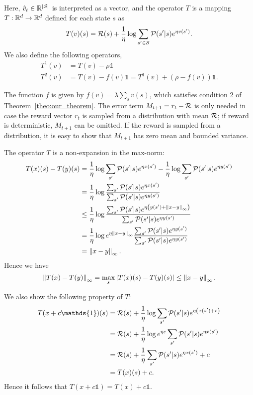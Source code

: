 Here, $\hat v_t\in\mathbb{R}^{\lvert\mathcal{S}\rvert}$ is interpreted as a vector, and the operator $T$ is a mapping $T:\mathbb{R}^d\rightarrow\mathbb{R}^d$ defined for each state $s$ as
\begin{equation*}
    T(v)(s) = \mathcal{R}(s) + \frac 1 \eta \log \sum_{s'\in\mathcal{S}} \mathcal{P}(s'|s) e^{ \eta v(s') }.
\end{equation*}
We also define the following operators, 
\begin{align*}
    T^1(v) &= T(v) - \rho\mathds{1} \\
    T^2(v) &= T(v) - f(v)\mathds{1} =  T^1(v) + (\rho - f(v))\mathds{1}.
\end{align*}

The function $f$ is given by $f(v) = \lambda\sum_s v(s)$, which satisfies condition 2 of Theorem~\ref{theo:our_theorem}. The error term $M_{t+1}=r_t-\mathcal{R}$ is only needed in case the reward vector $r_t$ is sampled from a distribution with mean $\mathcal{R}$; if reward is deterministic, $M_{t+1}$ can be omitted. If the reward is sampled from a distribution, it is easy to show that $M_{t+1}$ has zero mean and bounded variance.

The operator $T$ is a non-expansion in the max-norm:
\begin{align*}
T(x)(s) - T(y)(s) &= \frac 1 \eta \log \sum_{s'} \mathcal{P}(s'|s) e^{\eta x(s')} - \frac 1 \eta \log \sum_{s'} \mathcal{P}(s'|s) e^{\eta y(s')}\\
 &= \frac 1 \eta \log \frac {\sum_{s'} \mathcal{P}(s'|s) e^{\eta x(s')}} {\sum_{s'} \mathcal{P}(s'|s) e^{\eta y(s')}}\\
 &\leq \frac 1 \eta \log \frac {\sum_{s'} \mathcal{P}(s'|s) e^{\eta \left( y(s') + \left\|x-y\right\|_\infty \right)}} {\sum_{s'} \mathcal{P}(s'|s) e^{\eta y(s')}}\\
 &= \frac 1 \eta \log e^{\eta \left\|x-y\right\|_\infty } \frac {\sum_{s'} \mathcal{P}(s'|s) e^{\eta y(s')}} {\sum_{s'} \mathcal{P}(s'|s) e^{\eta y(s')}}\\
 &= \left\|x - y\right\|_\infty.
\end{align*}
Hence we have
\[
\left\|T(x)-T(y)\right\|_\infty = \max_s |T(x)(s) - T(y)(s)| \leq \left\|x - y\right\|_\infty.
\]

We also show the following property of $T$:
\begin{align*}
T(x + c\mathds{1})(s) &= \cR(s) + \frac 1 \eta \log \sum_{s'} \cP(s'|s) e^{\eta \pa{ x(s') + c }}\\
 &= \cR(s) + \frac 1 \eta \log e^{\eta c} \sum_{s'} \cP(s'|s) e^{\eta x(s')}\\
 &= \cR(s) + \frac 1 \eta \sum_{s'} \cP(s'|s) e^{\eta x(s')} + c\\
 &= T(x)(s) + c.
\end{align*}
Hence it follows that $T(x + c\mathds{1}) = T(x) + c\mathds{1}$.

